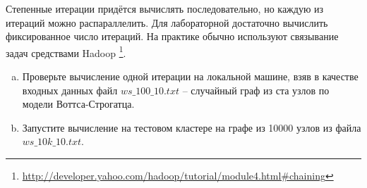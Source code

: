 \documentclass[a4paper,11pt]{article}
\begin{document}
\begin{enumerate}
  Степенные итерации придётся вычислять последовательно, но каждую из итераций
  можно распараллелить. Для лабораторной достаточно вычислить фиксированное
  число итераций. На практике обычно используют связывание задач средствами
  Hadoop%
\footnote{\href{http://developer.yahoo.com/hadoop/tutorial/module4.html\#chaining}
{http://developer.yahoo.com/hadoop/tutorial/module4.html\#chaining}}.
  \begin{enumerate}[(a)]
  \item Проверьте вычисление одной итерации на локальной машине, взяв в
    качестве входных данных файл $ws\_100\_10.txt$ -- случайный граф из
    ста узлов по модели Воттса-Строгатца.
  \item Запустите вычисление на тестовом кластере на графе из 10000 узлов из
    файла $ws\_10k\_10.txt$.
  \end{enumerate}
\end{enumerate}
\end{document}
